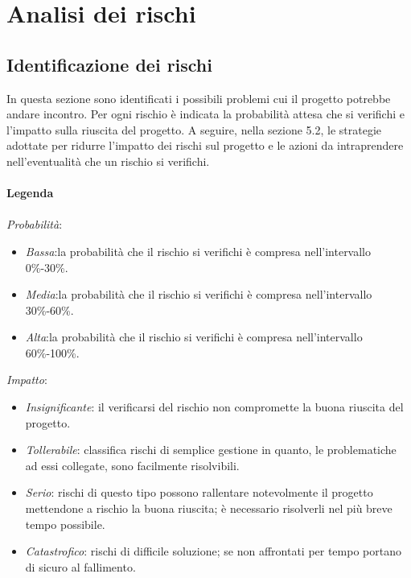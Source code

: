 \chapter{Analisi dei rischi}
\section{Identificazione dei rischi}
In questa sezione sono identificati i possibili problemi cui il progetto potrebbe andare incontro. Per ogni rischio è indicata la probabilità attesa che si verifichi e l'impatto sulla riuscita del progetto. A seguire, nella sezione 5.2, le strategie adottate per ridurre l'impatto dei rischi sul progetto e le azioni da intraprendere nell'eventualità che un rischio si verifichi.
\\ \\
\textbf{Legenda} \\ \\
\textit{Probabilità}:
\begin{itemize}
\item \textit{Bassa}:la probabilità che il rischio si verifichi è compresa nell'intervallo 0\%-30\%.
\item \textit{Media}:la probabilità che il rischio si verifichi è compresa nell'intervallo 30\%-60\%.
\item \textit{Alta}:la probabilità che il rischio si verifichi è compresa nell'intervallo 60\%-100\%.
\end{itemize}
\textit{Impatto}:
\begin{itemize}
\item \textit{Insignificante}: il verificarsi del rischio non compromette la buona riuscita del progetto.
\item \textit{Tollerabile}: classifica rischi di semplice gestione in quanto, le problematiche ad essi collegate, sono facilmente risolvibili.
\item \textit{Serio}: rischi di questo tipo possono rallentare notevolmente il progetto mettendone a rischio la buona riuscita; è necessario risolverli nel più breve tempo possibile.
\item \textit{Catastrofico}: rischi di difficile soluzione; se non affrontati per tempo portano di sicuro al fallimento.
\end{itemize}

